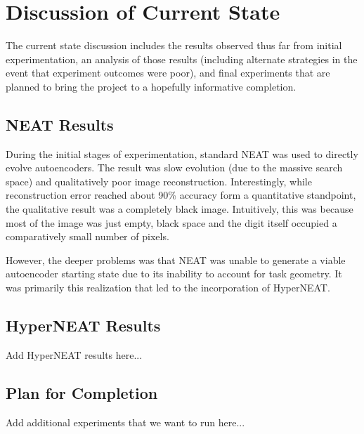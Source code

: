 \documentclass{acm_proc_article-sp}
\begin{document}

\section{Discussion of Current State}
The current state discussion includes the results observed thus far from initial experimentation, an analysis of those results (including alternate strategies in the event that experiment outcomes were poor), and final experiments that are planned to bring the project to a hopefully informative completion.

\subsection{NEAT Results}
During the initial stages of experimentation, standard NEAT was used to directly evolve autoencoders.  The result was slow evolution (due to the massive search space) and qualitatively poor image reconstruction.  Interestingly, while reconstruction error reached about 90\% accuracy form a quantitative standpoint, the qualitative result was a completely black image.  Intuitively, this was because most of the image was just empty, black space and the digit itself occupied a comparatively small number of pixels.

However, the deeper problems was that NEAT was unable to generate a viable autoencoder starting state due to its inability to account for task geometry.  It was primarily this realization that led to the incorporation of HyperNEAT.

\subsection{HyperNEAT Results}

Add HyperNEAT results here...

\subsection{Plan for Completion}

Add additional experiments that we want to run here...



\end{document}
